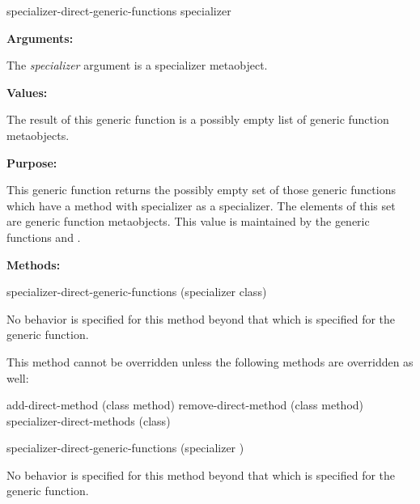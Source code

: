 \begin{defun}
specializer-direct-generic-functions specializer

\textbf{Arguments:}

The \emph{specializer} argument is a specializer metaobject.

\textbf{Values:}

The result of this generic function is a possibly empty list of generic function metaobjects.

\textbf{Purpose:}

This generic function returns the possibly empty set of those generic functions
which have a method with specializer as a specializer. The elements of this set
are generic function metaobjects. This value is maintained by the generic
functions  and .

\textbf{Methods:}

\begin{defun}
specializer-direct-generic-functions (specializer class)

No behavior is specified for this method beyond that which is specified for the generic function.

This method cannot be overridden unless the following methods are overridden as well:

    add-direct-method (class method)
    remove-direct-method (class method)
    specializer-direct-methods (class) 
\end{defun}

\begin{defun}
specializer-direct-generic-functions (specializer )

No behavior is specified for this method beyond that which is specified for the generic function.
\end{defun}
\end{defun}

